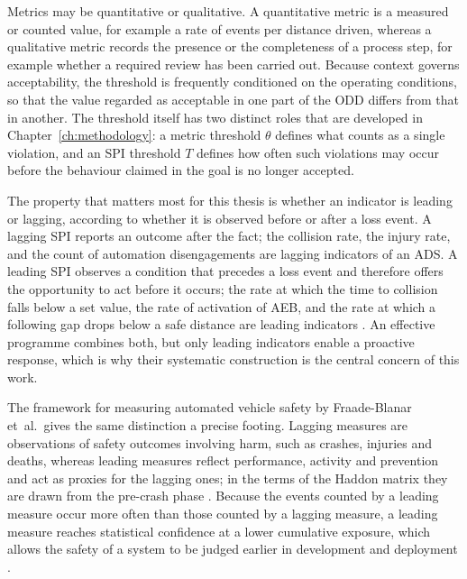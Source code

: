 Metrics may be quantitative or qualitative. A quantitative metric is a measured or
counted value, for example a rate of events per distance driven, whereas a qualitative
metric records the presence or the completeness of a process step, for example whether
a required review has been carried out. Because context governs acceptability, the
threshold is frequently conditioned on the operating conditions, so that the value
regarded as acceptable in one part of the \ac{ODD} differs from that in another. The
threshold itself has two distinct roles that are developed in
Chapter~\ref{ch:methodology}: a metric threshold $\theta$ defines what counts as a
single violation, and an SPI threshold $T$ defines how often such violations may
occur before the behaviour claimed in the goal is no longer accepted.

The property that matters most for this thesis is whether an indicator is leading or
lagging, according to whether it is observed before or after a loss event. A lagging
\ac{SPI} reports an outcome after the fact; the collision rate, the injury rate, and
the count of automation disengagements are lagging indicators of an \ac{ADS}. A leading
\ac{SPI} observes a condition that precedes a loss event and therefore offers the
opportunity to act before it occurs; the rate at which the time to collision falls
below a set value, the rate of activation of \ac{AEB}, and the rate
at which a following gap drops below a safe distance are leading indicators
\cite{koopman2022howsafe}. An effective programme combines both, but only leading
indicators enable a proactive response, which is why their systematic construction is
the central concern of this work.

The framework for measuring automated vehicle safety by Fraade-Blanar et~al.\ gives
the same distinction a precise footing. Lagging measures are observations of safety
outcomes involving harm, such as crashes, injuries and deaths, whereas leading
measures reflect performance, activity and prevention and act as proxies for the
lagging ones; in the terms of the Haddon matrix they are drawn from the pre-crash
phase \cite{fraadeblanar2018}. Because the events counted by a leading measure occur
more often than those counted by a lagging measure, a leading measure reaches
statistical confidence at a lower cumulative exposure, which allows the safety of a
system to be judged earlier in development and deployment \cite{fraadeblanar2018}.

